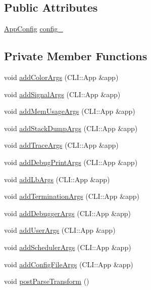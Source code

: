 \subsection*{Public Attributes}
\begin{DoxyCompactItemize}
\item 
\hyperlink{structvt_1_1arguments_1_1_app_config}{App\+Config} \hyperlink{structvt_1_1arguments_1_1_arg_config_af30e0eae1ac1b29f7c85c25636109a9e}{config\+\_\+}
\end{DoxyCompactItemize}
\subsection*{Private Member Functions}
\begin{DoxyCompactItemize}
\item 
void \hyperlink{structvt_1_1arguments_1_1_arg_config_a88f975427c3408ac8ada2add79fb9692}{add\+Color\+Args} (C\+L\+I\+::\+App \&app)
\item 
void \hyperlink{structvt_1_1arguments_1_1_arg_config_ac8c405111103fc7bef367cce277235d4}{add\+Signal\+Args} (C\+L\+I\+::\+App \&app)
\item 
void \hyperlink{structvt_1_1arguments_1_1_arg_config_aef7cb73c09dd2f554a550c2ab54b66f0}{add\+Mem\+Usage\+Args} (C\+L\+I\+::\+App \&app)
\item 
void \hyperlink{structvt_1_1arguments_1_1_arg_config_a0606d4951d3320d9489e65fccc1ab98b}{add\+Stack\+Dump\+Args} (C\+L\+I\+::\+App \&app)
\item 
void \hyperlink{structvt_1_1arguments_1_1_arg_config_ab3de7d531bd7f09c7ea1b37c9e57a02f}{add\+Trace\+Args} (C\+L\+I\+::\+App \&app)
\item 
void \hyperlink{structvt_1_1arguments_1_1_arg_config_afbe3ad33df89d6f702afa1b6e402e9a8}{add\+Debug\+Print\+Args} (C\+L\+I\+::\+App \&app)
\item 
void \hyperlink{structvt_1_1arguments_1_1_arg_config_a4e1787f38e5ed8f4732b9e27011abd24}{add\+Lb\+Args} (C\+L\+I\+::\+App \&app)
\item 
void \hyperlink{structvt_1_1arguments_1_1_arg_config_a0504992629228af199a906edc43b4d0a}{add\+Termination\+Args} (C\+L\+I\+::\+App \&app)
\item 
void \hyperlink{structvt_1_1arguments_1_1_arg_config_ad1c8bc76bc17ffd3245331c5cab90f0c}{add\+Debugger\+Args} (C\+L\+I\+::\+App \&app)
\item 
void \hyperlink{structvt_1_1arguments_1_1_arg_config_aa578460e6783d03ce25e349f8affea99}{add\+User\+Args} (C\+L\+I\+::\+App \&app)
\item 
void \hyperlink{structvt_1_1arguments_1_1_arg_config_ad41d94608d841c18dd302c80ed10c52d}{add\+Scheduler\+Args} (C\+L\+I\+::\+App \&app)
\item 
void \hyperlink{structvt_1_1arguments_1_1_arg_config_a05ce6db9c65585991e2e6e2d741b9dc7}{add\+Config\+File\+Args} (C\+L\+I\+::\+App \&app)
\item 
void \hyperlink{structvt_1_1arguments_1_1_arg_config_a688dc6a1e88d8544e2ab41b4db15d8cd}{post\+Parse\+Transform} ()
\end{DoxyCompactItemize}

